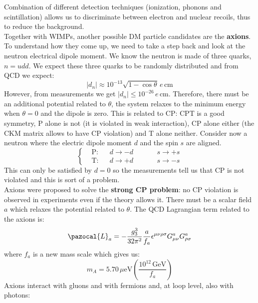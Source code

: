 \documentclass[10.75pt,a4paper,openright,bottom=2cm]{article}
\begin{document}
Combination of different detection techniques (ionization, phonons and scintillation) allows us to discriminate between electron and nuclear recoils, thus to reduce the background.\\
Together with WIMPs, another possible DM particle candidates are the \textbf{axions}. To understand how they come up, we need to take a step back and look at the neutron electrical dipole moment. We know the neutron is made of three quarks, $n=udd$. We expect these three quarks to be randomly distributed and from QCD we expect:
\[
|d_n|\approx10^{-13}\sqrt{1-\cos\theta}\,e\,\text{cm}
\]
However, from measurements we get $|d_n|\le10^{-26}\,e$\,cm. Therefore, there must be an additional potential related to $\theta$, the system relaxes to the minimum energy when $\theta=0$ and the dipole is zero. This is related to CP: CPT is a good symmetry, P alone is not (it is violated in weak interaction), CP alone either (the CKM matrix allows to have CP violation) and T alone neither. Consider now a neutron where the electric dipole moment $d$ and the spin $s$ are aligned.
\[
\left\{
\begin{aligned}
&\text{P}:&&d\to-d \quad &&&s\to+s\\
&\text{T}:&&d\to+d \quad &&&s\to-s
\end{aligned}
\right.
\]
This can only be satisfied by $d=0$ so the measurements tell us that CP is not violated and this is sort of a problem.\\
Axions were proposed to solve the \textbf{strong CP problem}: no CP violation is observed in experiments even if the theory allows it. There must be a scalar field $a$ which relaxes the potential related to $\theta$. The QCD Lagrangian term related to the axions is:
\[
\pazocal{L}_a=-\frac{g_3^3}{32\pi^2}\frac{a}{f_a}\epsilon^{\mu\nu\rho\sigma}G_{\mu\nu}^aG_{\rho\sigma}^a
\]
where $f_a$ is a new mass scale which gives us:
\[
m_A=5.70\,\text{$\mu$eV}\left(\frac{10^{12}\,\text{GeV}}{f_a}\right)
\]
Axions interact with gluons and with fermions and, at loop level, also with photons:\\
\begin{minipage}{0.5\textwidth}
\begin{center}
\end{center}
\end{minipage}\hspace*{-2cm}
\end{document}
